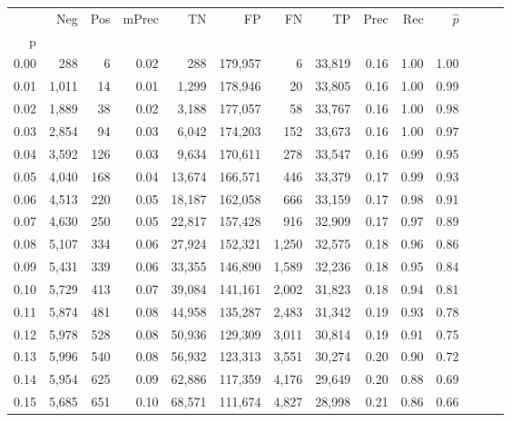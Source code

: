 \begin{tabular}{rrrrrrrrrrrrrr}
\toprule
{} &    Neg &  Pos & mPrec &       TN &       FP &      FN &      TP &  Prec &   Rec & $\hat{p}$ \\
p    &        &      &       &          &          &         &         &       &       &           \\
\midrule
0.00 &    288 &    6 &  0.02 &      288 &  179,957 &       6 &  33,819 &  0.16 &  1.00 &      1.00 \\
0.01 &  1,011 &   14 &  0.01 &    1,299 &  178,946 &      20 &  33,805 &  0.16 &  1.00 &      0.99 \\
0.02 &  1,889 &   38 &  0.02 &    3,188 &  177,057 &      58 &  33,767 &  0.16 &  1.00 &      0.98 \\
0.03 &  2,854 &   94 &  0.03 &    6,042 &  174,203 &     152 &  33,673 &  0.16 &  1.00 &      0.97 \\
0.04 &  3,592 &  126 &  0.03 &    9,634 &  170,611 &     278 &  33,547 &  0.16 &  0.99 &      0.95 \\
0.05 &  4,040 &  168 &  0.04 &   13,674 &  166,571 &     446 &  33,379 &  0.17 &  0.99 &      0.93 \\
0.06 &  4,513 &  220 &  0.05 &   18,187 &  162,058 &     666 &  33,159 &  0.17 &  0.98 &      0.91 \\
0.07 &  4,630 &  250 &  0.05 &   22,817 &  157,428 &     916 &  32,909 &  0.17 &  0.97 &      0.89 \\
0.08 &  5,107 &  334 &  0.06 &   27,924 &  152,321 &   1,250 &  32,575 &  0.18 &  0.96 &      0.86 \\
0.09 &  5,431 &  339 &  0.06 &   33,355 &  146,890 &   1,589 &  32,236 &  0.18 &  0.95 &      0.84 \\
0.10 &  5,729 &  413 &  0.07 &   39,084 &  141,161 &   2,002 &  31,823 &  0.18 &  0.94 &      0.81 \\
0.11 &  5,874 &  481 &  0.08 &   44,958 &  135,287 &   2,483 &  31,342 &  0.19 &  0.93 &      0.78 \\
0.12 &  5,978 &  528 &  0.08 &   50,936 &  129,309 &   3,011 &  30,814 &  0.19 &  0.91 &      0.75 \\
0.13 &  5,996 &  540 &  0.08 &   56,932 &  123,313 &   3,551 &  30,274 &  0.20 &  0.90 &      0.72 \\
0.14 &  5,954 &  625 &  0.09 &   62,886 &  117,359 &   4,176 &  29,649 &  0.20 &  0.88 &      0.69 \\
0.15 &  5,685 &  651 &  0.10 &   68,571 &  111,674 &   4,827 &  28,998 &  0.21 &  0.86 &      0.66 \\

\end{tabular}
